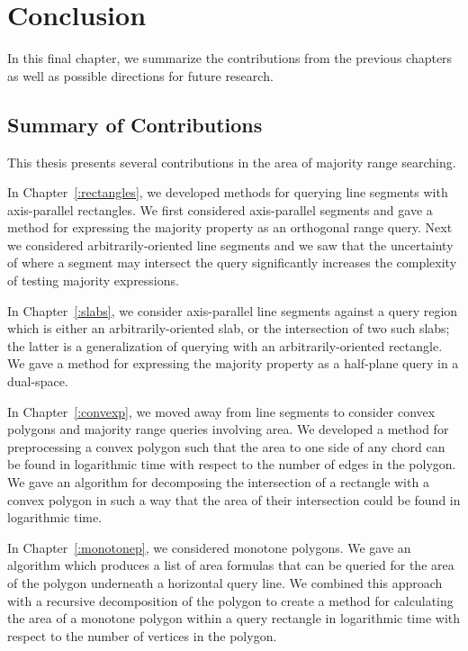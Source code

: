 \chapter{Conclusion}
\label{:conclusion}

In this final chapter, we summarize the contributions from the previous chapters as well as possible directions for future research.

\section{Summary of Contributions}
\label{:conclusion:contributions}

This thesis presents several contributions in the area of majority range searching.

In Chapter~\ref{:rectangles}, we developed methods for querying line segments with axis-parallel rectangles. 
We first considered axis-parallel segments and gave a method for expressing the majority property as an orthogonal range query. 
Next we considered arbitrarily-oriented line segments and we saw that the uncertainty of where a segment may intersect the query significantly increases the complexity of testing majority expressions.

In Chapter~\ref{:slabs}, we consider axis-parallel line segments against a query region which is either an arbitrarily-oriented slab, or the intersection of two such slabs; the latter is a generalization of querying with an arbitrarily-oriented rectangle. 
We gave a method for expressing the majority property as a half-plane query in a dual-space.

In Chapter~\ref{:convexp}, we moved away from line segments to consider convex polygons and majority range queries involving area. 
We developed a method for preprocessing a convex polygon such that the area to one side of any chord can be found in logarithmic time with respect to the number of edges in the polygon. 
We gave an algorithm for decomposing the intersection of a rectangle with a convex polygon in such a way that the area of their intersection could be found in logarithmic time. 

In Chapter~\ref{:monotonep}, we considered monotone polygons. 
We gave an algorithm which produces a list of area formulas that can be queried for the area of the polygon underneath a horizontal query line.
We combined this approach with a recursive decomposition of the polygon to create a method for calculating the area of a monotone polygon within a query rectangle in logarithmic time with respect to the number of vertices in the polygon. 


